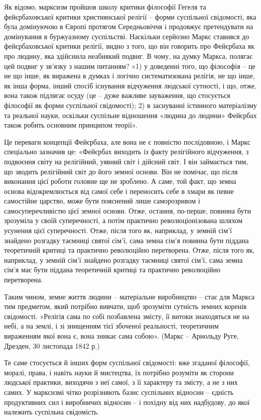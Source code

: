 \documentclass[../main]{subfiles}
\begin{document}
Як відомо, марксизм пройшов школу критики філософії Гегеля та фейєрбаховської критики християнської релігії – форми суспільної свідомості, яка була домінуючою в Європі протягом Середньовіччя і продовжує претендувати на домінування в буржуазному суспільстві. Наскільки серйозно Маркс ставився до фейєрбаховської критики релігії, видно з того, що він говорить про Фейєрбаха як про людину, яка здійснила неабиякий подвиг. В чому, на думку Маркса, полягає цей подвиг у зв’язку з нашим питанням? «1) у доведенні того, що філософія – це не що інше, як виражена в думках і логічно систематизована релігія, не що інше, як інша форма, інший спосіб існування відчуження людської сутності, і що, отже, вона також підлягає осуду (це – дуже важливе зауваження, що стосується філософії як форми суспільної свідомості); 2) в заснуванні істинного матеріалізму та реальної науки, оскільки суспільне відношення «людина до людини» Фейєрбах також робить основним принципом теорії».

Це переваги концепції Фейєрбаха, але вона не є повністю послідовною, і Маркс спеціально зазначив це: «Фейєрбах виходить із факту релігійного відчуження, з подвоєння світу на релігійний, уявний світ і дійсний світ. І він займається тим, що зводить релігійний світ до його земної основи. Він не помічає, що після виконання цієї роботи головне ще не зроблено. А саме, той факт, що земна основа відокремлюється від самої себе і переносить себе в хмари як певне самостійне царство, може бути пояснений лише саморозривом і самосуперечливістю цієї земної основи. Отже, остання, по-перше, повинна бути зрозуміла у своїй суперечності, а потім практично революціонізована шляхом усунення цієї суперечності. Отже, після того як, наприклад, у земній сім’ї знайдено розгадку таємниці святої сім’ї, сама земна сім’я повинна бути піддана теоретичній критиці та практично революційно перетворена. Отже, після того як, наприклад, у земній сім’ї знайдено розгадку таємниці святої сім’ї, сама земна сім’я має бути піддана теоретичній критиці та практично революційно перетворена.

Таким чином, земне життя людини – матеріальне виробництво – стає для Маркса тим предметом, який потрібно вивчати, щоб зрозуміти сутність земних коренів свідомості. «Релігія сама по собі позбавлена змісту, її витоки знаходяться не на небі, а на землі, і зі знищенням тієї збоченої реальності, теоретичним вираженням якої вона є, вона зникає сама собою». (Маркс – Арнольду Руге, Дрезден, 30 листопада 1842 р.)

Те саме стосується й інших форм суспільної свідомості: вже згаданої філософії, моралі, права, і навіть науки й мистецтва, їх потрібно розуміти як сторони людської практики, виходячи з неї самої, з її характеру та змісту, а не з них самих. У марксизмі чітко розрізняють базис суспільних відносин – єдність продуктивних сил і виробничих відносин – і похідну від них надбудову, до якої належить суспільна свідомість.
\end{document}
